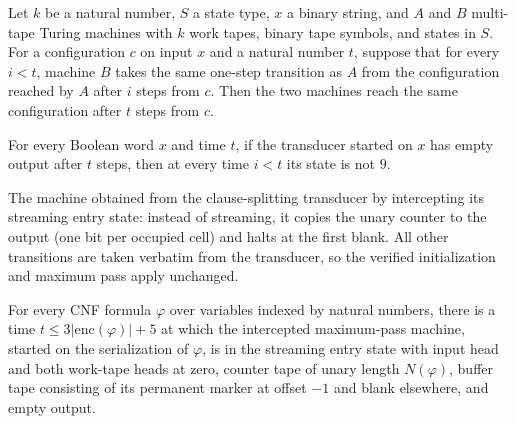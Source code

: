 \begin{lemma}
\label{Complexity.sat_run_agree}
\leanok
{}
Let $k$ be a natural number, $S$ a state type, $x$ a binary string, and $A$ and $B$
multi-tape Turing machines with $k$ work tapes, binary tape symbols, and states in $S$.
For a configuration $c$ on input $x$ and a natural number $t$, suppose that for every
$i<t$, machine $B$ takes the same one-step transition as $A$ from the configuration
reached by $A$ after $i$ steps from $c$. Then the two machines reach the same
configuration after $t$ steps from $c$.
\end{lemma}

\begin{lemma}
\label{Complexity.satRed_start_guard}
\leanok
{}
For every Boolean word $x$ and time $t$, if the transducer started on $x$ has empty
output after $t$ steps, then at every time $i<t$ its state is not $9$.
\end{lemma}

\begin{definition}
\label{Complexity.satMaxTM}
\leanok
{}
The machine obtained from the clause-splitting transducer by intercepting its
streaming entry state: instead of streaming, it copies the unary counter to the
output (one bit per occupied cell) and halts at the first blank. All other
transitions are taken verbatim from the transducer, so the verified
initialization and maximum pass apply unchanged.
\end{definition}

\begin{lemma}
\label{Complexity.satMax_start}
\leanok
{}
For every CNF formula $\varphi$ over variables indexed by natural numbers, there is a
time $t\le 3|\mathrm{enc}(\varphi)|+5$ at which the intercepted maximum-pass machine,
started on the serialization of $\varphi$, is in the streaming entry state with input
head and both work-tape heads at zero, counter tape of unary length $N(\varphi)$, buffer
tape consisting of its permanent marker at offset $-1$ and blank elsewhere, and empty
output.
\end{lemma}

